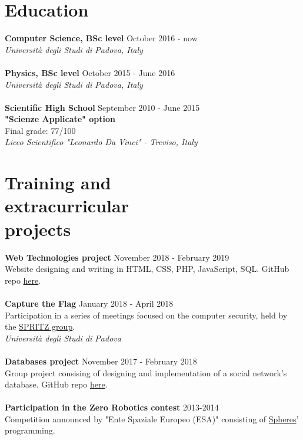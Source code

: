 \documentclass[margin, 10pt]{res}
\begin{document}
\begin{resume}
\section{Education}
\textbf{Computer Science, BSc level} \hfill October 2016 - now \\
\textit{Università degli Studi di Padova, Italy} \\ \\
\textbf{Physics, BSc level} \hfill October 2015 - June 2016 \\
\textit{Università degli Studi di Padova, Italy} \\ \\
\textbf{Scientific High School} \hfill September 2010 - June 2015 \\
\textbf{"Scienze Applicate" option} \\
Final grade: 77/100 \\
\textit{Liceo Scientifico "Leonardo Da Vinci" - Treviso, Italy} 


\section{Training and\\ extracurricular \\ projects}
\textbf{Web Technologies project} \hfill November 2018 - February 2019 \\
Website designing and writing in HTML, CSS, PHP, JavaScript, SQL. GitHub repo \href{https://github.com/enricobu96/TecWebUNIPD}{here}.\\ \\
\textbf{Capture the Flag} \hfill January 2018 - April 2018 \\
Participation in a series of meetings focused on the computer security, held by the \href{https://github.com/enricobu96/TecWebUNIPD}{SPRITZ group}. \\
\textit{Università degli Studi di Padova} \\ \\
\textbf{Databases project} \hfill November 2017 - February 2018 \\
Group project consising of designing and implementation of a social network's database. GitHub repo \href{https://github.com/enricobu96/DB1718}{here}. \\ \\
\newpage
\textbf{Participation in the Zero Robotics contest} \hfill 2013-2014 \\
Competition announced by "Ente Spaziale Europeo (ESA)" consisting of \href{https://www.esa.int/Science_Exploration/Human_and_Robotic_Exploration/Education/Robot_Spheres_in_zero-gravity_action}{Spheres}' programming.


\end{resume}
\end{document}
